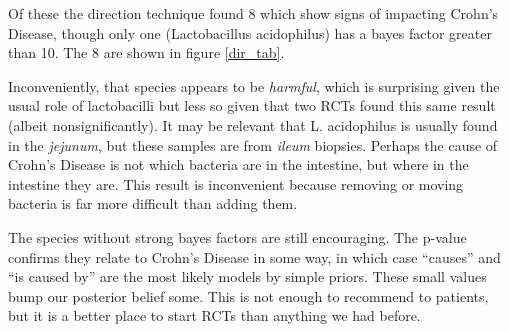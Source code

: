 \documentclass[twocolumn,12pt]{article}
\begin{document}
Of these the direction technique found 8 which show signs of impacting
Crohn's Disease, though only one (Lactobacillus acidophilus) has a
bayes factor greater than 10.  The 8 are shown in figure \ref{dir_tab}.

Inconveniently, that species appears to
be \textit{harmful}, which is surprising given the usual role of
lactobacilli but less so given that two RCTs found this same result
(albeit nonsignificantly)\cite{lgg1,lgg2}.  It may be relevant that
L. acidophilus is usually found in the
\textit{jejunum}\cite{lacid}, but these samples are from
\textit{ileum} biopsies.  Perhaps the cause of Crohn's Disease is not
which bacteria are in the intestine, but where in the intestine they
are.  This result is inconvenient because removing or moving bacteria
is far more difficult than adding them.

The species without strong bayes factors are still encouraging.  The
p-value confirms they relate to Crohn's Disease in some way, in which
case ``causes'' and ``is caused by'' are the most likely models by
simple priors.  These small values bump our posterior belief some.
This is not enough to recommend to patients, but it is a better place
to start RCTs than anything we had before.

\newpage
\end{document}
